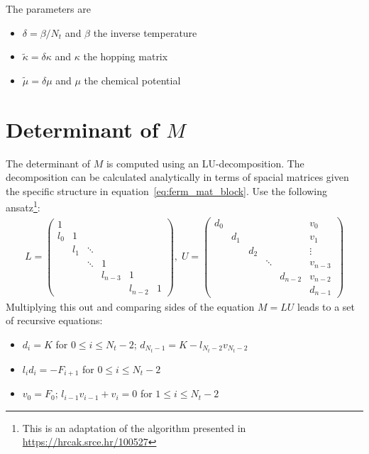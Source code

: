 \documentclass[a4paper, fleqn, twoside, notitlepage]{scrartcl}
\begin{document}
The parameters are
\begin{itemize}
\item $\delta = \beta / N_t$ and $\beta$ the inverse temperature
\item $\tilde{\kappa} = \delta\kappa$ and $\kappa$ the hopping matrix
\item $\tilde{\mu} = \delta\mu$ and $\mu$ the chemical potential
\end{itemize}


\section{Determinant of $M$}

The determinant of $M$ is computed using an LU-decomposition. The decomposition can be calculated analytically in terms of spacial matrices given the specific structure in equation~\eqref{eq:ferm_mat_block}.
Use the following ansatz\footnote{This is an adaptation of the algorithm presented in \url{https://hrcak.srce.hr/100527}}:
\begin{align}
  L =
  \begin{pmatrix}
    1   &     &    &        &        &\\
    l_0 & 1   &    &        &        &\\
        & l_1 & \ddots &        &        &\\
        &     & \ddots & 1      &        &\\
        &     &   & l_{n-3} & 1      &\\
        &     &   &        & l_{n-2} & 1
  \end{pmatrix},
  \; U =
  \begin{pmatrix}
    d_0 &     &      &   &        & v_0\\
        & d_1 &     &    &        & v_1\\
        &     & d_2 &    &        & \vdots \\
        &     &     & \ddots &        & v_{n-3} \\
        &     &     &    & d_{n-2} & v_{n-2} \\
        &     &     &    &        & d_{n-1}
  \end{pmatrix}
\end{align}
Multiplying this out and comparing sides of the equation $M = LU$ leads to a set of recursive equations:
\begin{itemize}
\item $d_i = K$ for $0 \le i \le N_t-2$;\hspace{2em} $d_{N_t-1} = K - l_{N_t-2}v_{N_t-2}$
\item $l_i d_i = -F_{i+1}$ for $0 \le i \le N_t-2$
\item $v_0 = F_0$;\hspace{2em} $l_{i-1} v_{i-1} + v_i = 0$ for $1 \le i \le N_t-2$
\end{itemize}
\end{document}
